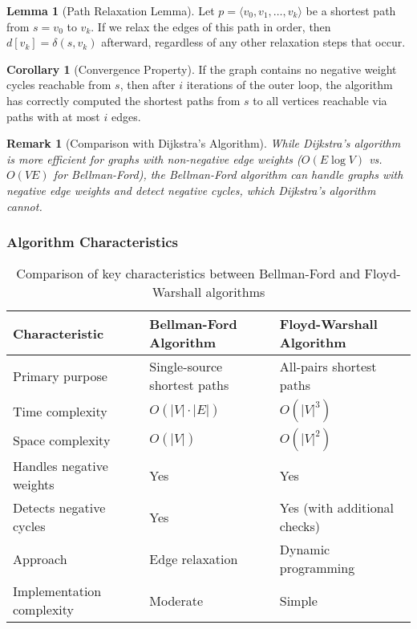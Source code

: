 \documentclass{article}
\newtheorem{remark}{Remark}
\theoremstyle{definition}
\newtheorem{lemma}{Lemma}
\newtheorem{corollary}{Corollary}
\begin{document}
\begin{lemma}[Path Relaxation Lemma]
Let $p = \langle v_0, v_1, \ldots, v_k \rangle$ be a shortest path from $s = v_0$ to $v_k$. If we relax the edges of this path in order, then $d[v_k] = \delta(s, v_k)$ afterward, regardless of any other relaxation steps that occur.
\end{lemma}

\begin{corollary}[Convergence Property]
If the graph contains no negative weight cycles reachable from $s$, then after $i$ iterations of the outer loop, the algorithm has correctly computed the shortest paths from $s$ to all vertices reachable via paths with at most $i$ edges.
\end{corollary}

\begin{remark}[Comparison with Dijkstra's Algorithm]
While Dijkstra's algorithm is more efficient for graphs with non-negative edge weights ($O(E \log V)$ vs. $O(VE)$ for Bellman-Ford), the Bellman-Ford algorithm can handle graphs with negative edge weights and detect negative cycles, which Dijkstra's algorithm cannot.
\end{remark}

\subsubsection{Algorithm Characteristics}

\begin{table}[h]
\centering
\begin{tabular}{|p{3cm}|p{5.5cm}|p{5.5cm}|}
\hline
\textbf{Characteristic} & \textbf{Bellman-Ford Algorithm} & \textbf{Floyd-Warshall Algorithm} \\
\hline
Primary purpose & Single-source shortest paths & All-pairs shortest paths \\
\hline
Time complexity & $O(|V| \cdot |E|)$ & $O(|V|^3)$ \\
\hline
Space complexity & $O(|V|)$ & $O(|V|^2)$ \\
\hline
Handles negative weights & Yes & Yes \\
\hline
Detects negative cycles & Yes & Yes (with additional checks) \\
\hline
Approach & Edge relaxation & Dynamic programming \\
\hline
Implementation complexity & Moderate & Simple \\
\hline
\end{tabular}
\caption{Comparison of key characteristics between Bellman-Ford and Floyd-Warshall algorithms}
\end{table}
\end{document}
